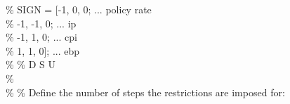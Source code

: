 \hspace{1mm}\hspace{5mm} \hspace{5mm} \hspace{5mm} \hspace{5mm} \hspace{5mm} \textcolor{matlabgreen}{\% SIGN = [-1,       0,      0;        ... policy rate }\\ 
\hspace{1mm}\hspace{5mm} \hspace{5mm} \hspace{5mm} \hspace{5mm} \hspace{5mm} \textcolor{matlabgreen}{\%         -1,      -1,      0;        ... ip         }\\ 
\hspace{1mm}\hspace{5mm} \hspace{5mm} \hspace{5mm} \hspace{5mm} \hspace{5mm} \textcolor{matlabgreen}{\%         -1,       1,      0;        ... cpi }\\ 
\hspace{1mm}\hspace{5mm} \hspace{5mm} \hspace{5mm} \hspace{5mm} \hspace{5mm} \textcolor{matlabgreen}{\%          1,       1,      0];       ... ebp }\\ 
\hspace{1mm}\hspace{5mm} \hspace{5mm} \hspace{5mm} \hspace{5mm} \hspace{5mm} \textcolor{matlabgreen}{\%        }\textcolor{matlabgreen}{\% D        S       U    }\\ 
\hspace{1mm}\hspace{5mm} \hspace{5mm} \hspace{5mm} \hspace{5mm} \hspace{5mm} \textcolor{matlabgreen}{\%  }\\ 
\hspace{1mm}\hspace{5mm} \hspace{5mm} \hspace{5mm} \hspace{5mm} \hspace{5mm} \textcolor{matlabgreen}{\% }\textcolor{matlabgreen}{\% Define the number of steps the restrictions are imposed for: }\\ 
